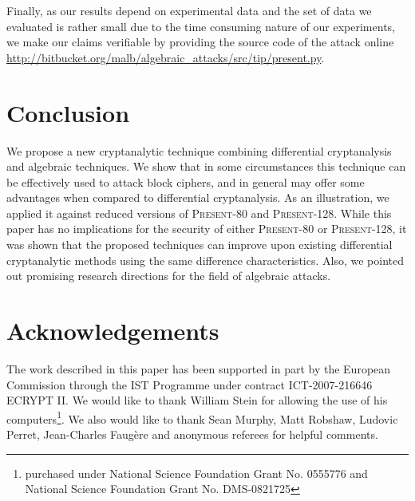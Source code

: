 \documentclass{llncs}
\newcommand{\blind}[1]{#1}
\newcommand{\PRESENT}{\textsc{Present}\xspace}
\begin{document}
Finally, as our results depend on experimental data and the set of data we
evaluated is rather small due to the time consuming nature of our
experiments,  we make our claims verifiable by providing the source code of
the attack
online
\blind{\url{http://bitbucket.org/malb/algebraic_attacks/src/tip/present.py}}.


\section{Conclusion}
We propose a new cryptanalytic technique combining differential cryptanalysis
and algebraic techniques. We show that in some circumstances this
technique can be effectively used to attack block ciphers, and in general
may offer some advantages when compared to differential cryptanalysis.
As an illustration, we applied it against reduced versions of \PRESENT-80 and
\PRESENT-128. While this paper has no implications for the security of
either \PRESENT-80 or \PRESENT-128, it was shown that the proposed techniques
can improve upon existing differential cryptanalytic methods using the same
difference characteristics. Also, we pointed out promising
research directions for the field of algebraic attacks.

\blind{
\section*{Acknowledgements}
The work described in this paper has been supported in part by the European
Commission through the IST Programme under contract ICT-2007-216646 ECRYPT II.
We would like to thank William Stein for allowing the use of his
computers\footnote{purchased under National Science Foundation Grant No.
0555776 and National Science Foundation Grant No. DMS-0821725}. We also would
like to thank Sean Murphy, Matt Robshaw, Ludovic Perret, Jean-Charles
Faug{\`e}re and anonymous referees for helpful comments.
}




\newpage
\appendix

\clearpage
\end{document}
